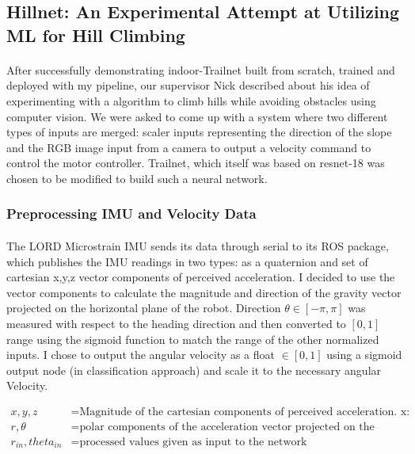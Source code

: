 
\newpage
\subsection{Hillnet: An Experimental Attempt at Utilizing ML for Hill Climbing}

\paragraph{}
After successfully demonstrating indoor-Trailnet built from scratch, trained and deployed with my pipeline, our supervisor Nick described about his idea of experimenting with a algorithm to climb hills while avoiding obstacles using computer vision. We were asked to come up with a system where two different types of inputs are merged: scaler inputs representing the direction of the slope and the RGB image input from a camera to output a velocity command to control the motor controller. Trailnet, which itself was based on resnet-18 was chosen to be modified to build such a neural network.

\subsubsection{Preprocessing IMU and Velocity Data}

\paragraph{}
The LORD Microstrain IMU sends its data through serial to its ROS package, which publishes the IMU readings in two types: as a quaternion and set of cartesian x,y,z vector components of perceived acceleration. I decided to use the vector components to calculate the magnitude and direction of the gravity vector projected on the horizontal plane of the robot. Direction $\theta \in [-\pi, \pi]$ was measured with respect to the heading direction and then converted to $[0, 1]$ range using the sigmoid function to match the range of the other normalized inputs. I chose to output the angular velocity as a float $\in [0,1]$ using a sigmoid output node (in classification approach) and scale it to the necessary angular Velocity.

\begin{align*}
    x, y, z   &= \text{Magnitude of the cartesian components of perceived acceleration. x: forward, z: vertical} \\
    r, \theta &= \text{polar components of the acceleration vector projected on the horizontal plane of robot} \\
    r_{in}, theta_{in}     &= \text{processed values given as input to the network}
\end{align*}

